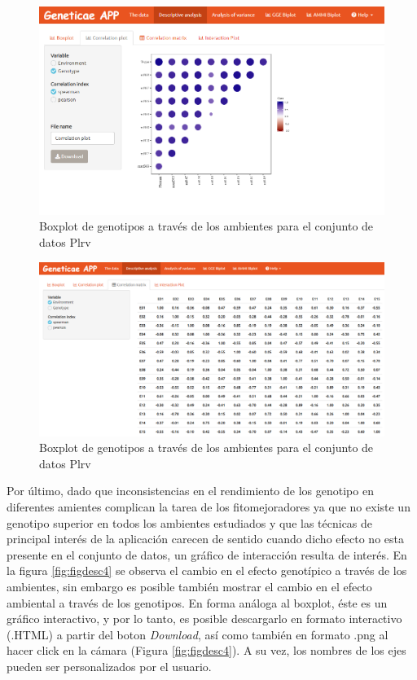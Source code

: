 \begin{figure}[H]
	\begin{center}
		\includegraphics[width=16cm]{./Graficos/corr_gen.png}
	\end{center}
	\caption{Boxplot de genotipos a través de los ambientes para el conjunto de datos Plrv}
	\label{fig:figdesc2}
\end{figure}


\begin{figure}[H]
	\begin{center}
		\includegraphics[width=16cm]{./Graficos/corr_matrix.png}
	\end{center}
	\caption{Boxplot de genotipos a través de los ambientes para el conjunto de datos Plrv}
	\label{fig:figdesc3}
\end{figure}



Por último, dado que inconsistencias en el rendimiento de los genotipo en diferentes amientes complican la tarea de los fitomejoradores ya que no existe un genotipo superior en todos los ambientes estudiados y que las técnicas de principal interés de la aplicación carecen de sentido cuando dicho efecto no esta presente en el conjunto de datos, un gráfico de interacción resulta de interés. En la figura \ref{fig:figdesc4} se observa el cambio en el efecto genotípico a través de los ambientes, sin embargo es posible también mostrar el cambio en el efecto ambiental a través de los genotipos.
En forma análoga al boxplot, éste es un gráfico interactivo, y por lo tanto, es posible descargarlo en formato interactivo (.HTML) a partir del boton \emph{Download}, así como también en formato .png al hacer click en la cámara (Figura \ref{fig:figdesc4}). A su vez, los nombres de los ejes pueden ser personalizados por el usuario. 



